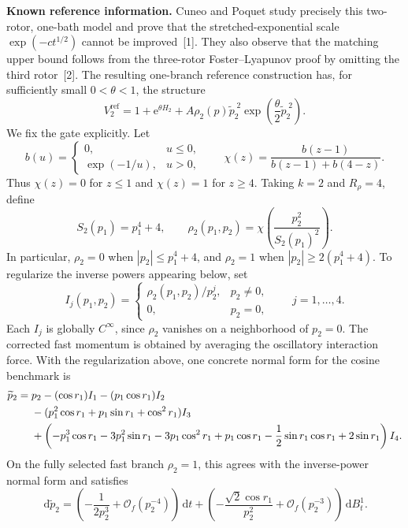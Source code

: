 \documentclass[11pt]{article}
\newcommand{\1}{\mathbf{1}}
\newcommand{\cO}{\mathcal{O}}
\newcommand{\ee}{\mathrm{e}}
\newcommand{\dd}{\,\mathrm{d}}
\newcommand{\wt}[1]{\widetilde{#1}}
\begin{document}
\medskip
\noindent\textbf{Known reference information.}
Cuneo and Poquet study precisely this two-rotor, one-bath model and prove that the stretched-exponential scale $\exp(-ct^{1/2})$ cannot be improved~[1]. They also observe that the matching upper bound follows from the three-rotor Foster--Lyapunov proof by omitting the third rotor~[2]. The resulting one-branch reference construction has, for sufficiently small $0<\theta<1$, the structure
\begin{equation}
V_2^{\mathrm{ref}}=1+\ee^{\theta H_2}
+A\rho_2(p)\wt p_2^{\;2}\exp\!\left(\frac\theta2\wt p_2^{\;2}\right).
\end{equation}
We fix the gate explicitly. Let
\begin{equation}
b(u)=
\begin{cases}
0,&u\le0,\\
\exp(-1/u),&u>0,
\end{cases}
\qquad
\chi(z)=\frac{b(z-1)}{b(z-1)+b(4-z)}.
\end{equation}
Thus $\chi(z)=0$ for $z\le1$ and $\chi(z)=1$ for $z\ge4$. Taking $k=2$ and $R_\rho=4$, define
\begin{equation}
S_2(p_1)=p_1^4+4,
\qquad
\rho_2(p_1,p_2)=\chi\!\left(\frac{p_2^2}{S_2(p_1)^2}\right).
\end{equation}
In particular, $\rho_2=0$ when $|p_2|\le p_1^4+4$, and $\rho_2=1$ when $|p_2|\ge2(p_1^4+4)$. To regularize the inverse powers appearing below, set
\begin{equation}
I_j(p_1,p_2)=
\begin{cases}
\rho_2(p_1,p_2)/p_2^j,&p_2\ne0,\\
0,&p_2=0,
\end{cases}
\qquad j=1,\ldots,4.
\end{equation}
Each $I_j$ is globally $C^\infty$, since $\rho_2$ vanishes on a neighborhood of $p_2=0$. The corrected fast momentum is obtained by averaging the oscillatory interaction force. With the regularization above, one concrete normal form for the cosine benchmark is
\begin{align}
\wt p_2={}&p_2-(\cos r_1)I_1-(p_1\cos r_1)I_2\notag\\
&-(p_1^2\cos r_1+p_1\sin r_1+\cos^2r_1)I_3\notag\\
&+\left(-p_1^3\cos r_1-3p_1^2\sin r_1-3p_1\cos^2r_1+p_1\cos r_1
-\frac12\sin r_1\cos r_1+2\sin r_1\right)I_4.
\end{align}
On the fully selected fast branch $\rho_2=1$, this agrees with the inverse-power normal form and satisfies
\begin{equation}
\dd\wt p_2=
\left(-\frac{1}{2p_2^3}+\cO_f(p_2^{-4})\right)\dd t
+\left(-\frac{\sqrt2\cos r_1}{p_2^2}+\cO_f(p_2^{-3})\right)\dd B_t^1.
\end{equation}
\end{document}
